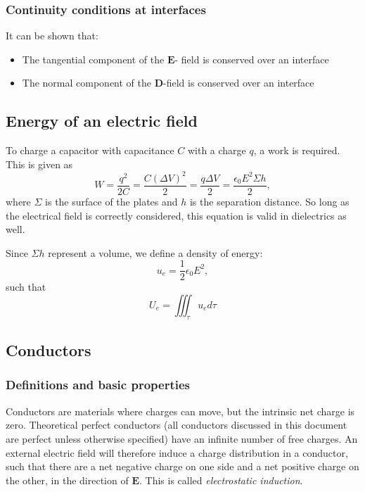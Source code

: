 \documentclass[a4paper, 12pt]{article}
\renewcommand{\vec}[1]{\mathbf{#1}}
\newcommand{\E}{\ensuremath{\vec{E}}}
\newcommand{\e}{\ensuremath{\epsilon_0}}
\newcommand{\D}{\ensuremath{\vec{D}}}
\begin{document}
    \subsubsection{Continuity conditions at interfaces}
        It can be shown that:
        \begin{itemize}
            \item The tangential component of the $\E$- field is conserved over an interface
            \item The normal component of the $\D$-field is conserved over an interface
        \end{itemize}

\subsection{Energy of an electric field}
    To charge a capacitor with capacitance $C$ with a charge $q$, a work is required. This is given as 
    \begin{equation}
        W = \frac{q^2}{2C} = \frac{C(\Delta V)^2}{2} = \frac{q\Delta V}{2} = \frac{\e E^2\Sigma h}{2},
    \end{equation}
    where $\Sigma$ is the surface of the plates and $h$ is the separation distance. 
    So long as the electrical field is correctly considered, this equation is valid in dielectrics as well.
    
    Since $\Sigma h$ represent a volume, we define a density of energy: 
    \begin{equation}
        u_e = \frac{1}{2}\e E^2, 
    \end{equation}
    such that 
    \begin{equation}
        U_e = \iiint_\tau u_e d\tau
    \end{equation}
    
\subsection{Conductors}
    \subsubsection{Definitions and basic properties}
        Conductors are materials where charges can move, but the intrinsic net charge is zero. 
        Theoretical perfect conductors (all conductors discussed in this document are perfect unless otherwise specified) 
        have an infinite number of free charges. 
        An external electric field will therefore induce a charge distribution in a conductor, 
        such that there are a net negative charge on one side and a net positive charge on the other, 
        in the direction of $\E$. This is called \textit{electrostatic induction}.
        
\end{document}
